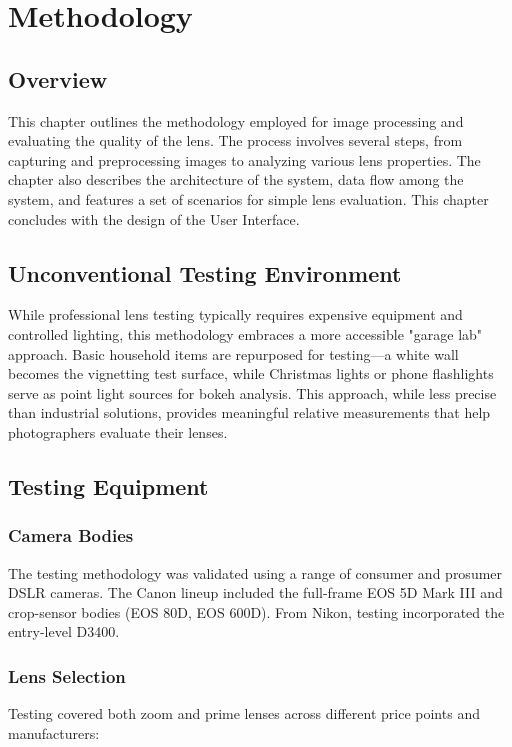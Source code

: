 \chapter{Methodology}

\section{Overview}
This chapter outlines the methodology employed for image processing and evaluating the quality of the lens. The process involves several steps, from capturing and preprocessing images to analyzing various lens properties. The chapter also describes the architecture of the system, data flow among the system, and features a set of scenarios for simple lens evaluation. This chapter concludes with the design of the User Interface.

\section{Unconventional Testing Environment}
While professional lens testing typically requires expensive equipment and controlled lighting, this methodology embraces a more accessible "garage lab" approach. Basic household items are repurposed for testing---a white wall becomes the vignetting test surface, while Christmas lights or phone flashlights serve as point light sources for bokeh analysis. This approach, while less precise than industrial solutions, provides meaningful relative measurements that help photographers evaluate their lenses.

\section{Testing Equipment}

\subsection{Camera Bodies}
The testing methodology was validated using a range of consumer and prosumer DSLR cameras. The Canon lineup included the full-frame EOS 5D Mark III and crop-sensor bodies (EOS 80D, EOS 600D). From Nikon, testing incorporated the entry-level D3400.

\subsection{Lens Selection}
Testing covered both zoom and prime lenses across different price points and manufacturers:

